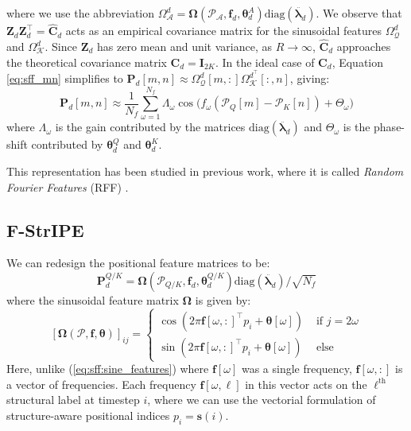 where we use the abbreviation $\Omega_\mathcal{A}^d = \boldsymbol{\Omega}\left(\mathcal{P}_\mathcal{A}, \boldsymbol{f}_d, \boldsymbol{\theta}_d^A \right) \text{diag}\left(\ddot{\boldsymbol{\lambda}_d}\right)$. We observe that $\mathbf{Z}_d \mathbf{Z}_d^\top = \widehat{\mathbf{C}}_d$ acts as an empirical covariance matrix for the sinusoidal features $\Omega_\mathcal{Q}^d$ and $\Omega_\mathcal{K}^d$. Since $\mathbf{Z}_d$ has zero mean and unit variance, as $R \to \infty$, $\widehat{\mathbf{C}}_d$ approaches the theoretical covariance matrix $\mathbf{C}_d = \mathbf{I}_{2K}$.
In the ideal case of $\mathbf{C}_d$, Equation \ref{eq:sff_mn} simplifies to $\mathbf{P}_d[m, n] \approx \Omega_\mathcal{Q}^d [m, :] \Omega_\mathcal{K}^{d^\top} [:, n]$, giving:
\begin{equation} \label{eq:ideal_C}
    \mathbf{P}_d[m, n] \approx  \frac{1}{N_f}  \sum_{\omega = 1}^{N_f} \Lambda_\omega \cos \big( f_{\omega} ( \mathcal{P}_Q[m] - \mathcal{P}_K[n] ) + \Theta_\omega \big)
\end{equation}
where $\Lambda_\omega$ is the gain contributed by the matrices $\text{diag}\left(\ddot{\boldsymbol{\lambda}_d}\right)$ and $\Theta_\omega$ is the phase-shift contributed by $\boldsymbol{\theta}^Q_d$ and $\boldsymbol{\theta}^K_d$.

This representation has been studied in previous work, where it is called \textit{Random Fourier Features} (RFF) \cite{rahimi_random_2007, sutherland_error_2015}.

\subsection{F-StrIPE}

We can redesign the positional feature matrices to be:
\begin{equation} \label{eq:rff}
    \mathbf{P}^{Q/K}_d = \boldsymbol{\Omega}\left(\mathcal{P}_{Q/K}, \boldsymbol{f}_d, \boldsymbol{\theta}_d^{Q/K}\right) \text{diag}\left(\ddot{\boldsymbol{\lambda}_d}\right) / \sqrt{N_f}
\end{equation}
where the sinusoidal feature matrix $\boldsymbol{\Omega}$ is given by:
\begin{equation} \label{eq:sff:sinusoidal_features}
    [\boldsymbol{\Omega}(\mathcal{P}, \boldsymbol{f}, \boldsymbol{\theta})]_{i j}= \begin{cases}\cos \left(2 \pi \mathbf{f}[\omega, :]^\top p_i+\boldsymbol{\theta}[\omega]\right) & \text { if } j = 2\omega \\ \sin \left(2 \pi \mathbf{f}[\omega, :]^\top p_i+\boldsymbol{\theta}[\omega] \right) & \text { else }\end{cases}
\end{equation}
Here, unlike (\ref{eq:sff:sine_features}) where $\mathbf{f}[\omega]$ was a single frequency, $\mathbf{f}[\omega, :]$ is a vector of frequencies. Each frequency $\mathbf{f}[\omega, \ell]$ in this vector acts on the $\ell^{\text{th}}$ structural label at timestep $i$, where we can use the vectorial formulation of structure-aware positional indices $p_i = \mathbf{s}(i)$.

